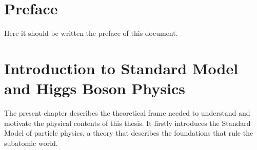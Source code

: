 \documentclass[11pt,twoside]{book}
\begin{document}
\pagestyle{empty}


\cleardoublepage

\pagestyle{fancy}


\hypersetup{linkcolor=black}
\tableofcontents
\clearpage
\hypersetup{linkcolor=blue}


\clearpage



\newpage

\setlength{\parindent}{15pt} %
\setlength{\parskip}{1.2mm plus 0.1mm} %

\chapter*{Preface}
\label{chap:preface}

Here it should be written the preface of this document.



\chapter{Introduction to Standard Model and Higgs Boson Physics}
\label{chap:detector}

The present chapter describes the theoretical frame needed to understand and motivate the physical contents of this thesis. 
It firstly introduces the Standard Model of particle physics, a theory that describes the foundations that rule the subatomic world. 

\end{document}
